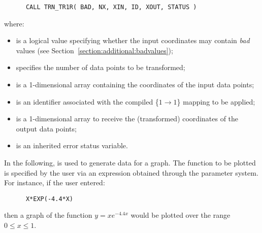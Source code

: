 \begin{verbatim}
      CALL TRN_TR1R( BAD, NX, XIN, ID, XOUT, STATUS )
\end{verbatim}

where:

\begin{itemize}

\item {} is a logical value specifying whether the input
coordinates may contain {\em bad} values (see
Section~\ref{section:additional:badvalues}); 

\item {} specifies the number of data points to be transformed;

\item {} is a 1-dimensional array containing the coordinates of
the input data points; 

\item {} is an identifier associated with the compiled \mbox{\{$1
\rightarrow 1$\}} mapping to be applied; 

\item {} is a 1-dimensional array to receive the (transformed)
coordinates of the output data points; 

\item {} is an inherited error status variable.

\end{itemize}

In the following,  is used to generate data for a graph. 
The function to be plotted is specified by the user via an expression
obtained through the  parameter system. 
For instance, if the user entered:

\begin{verbatim}
      X*EXP(-4.4*X)
\end{verbatim}

then a graph of the function \mbox{$y=xe^{-4.4x}$} would be plotted over the 
range \mbox{$0\le x\le 1$}.


